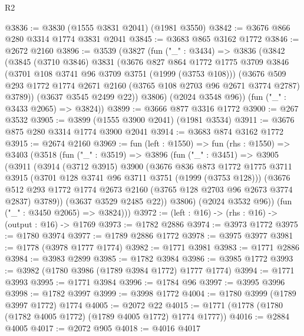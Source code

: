 \begin{lexlean}{R2}
\begin{coremodule}
@3836 := @3830 (@1555 @3831 @2041) (@1981 @3550)
@3842 := @3676 @866 @280 @3314 @1774 @3831 @2041
@3845 := @3683 @865 @3162 @1772
@3846 := @2672 @2160
@3896 := @3539
    (@3827
      (fun ("_" : @3434) =>
      @3836
        (@3842
          (@3845
            (@3710 @3846)
            @3831
            (@3676
              @827
              @864
              @1772
              @1775
              @3709
              @3846
              (@3701 @108 @3741 @96 @3709 @3751 (@1999 (@3753 @108)))
              (@3676
                @509
                @293
                @1772
                @1774
                @2671
                @2160
                (@3765 @108 @2703 @96 @2671 @3774 @2787)
                @3789))
            (@3637 @3545 @2499 @22))
          @3806)
        (@2024 @3548 @96))
      (fun ("_" : @3433 @2065) => @3824))
@3899 := @3666 @877 @3316 @1772
@3900 := @267 @3532
@3905 := @3899 (@1555 @3900 @2041) (@1981 @3534)
@3911 := @3676 @875 @280 @3314 @1774 @3900 @2041
@3914 := @3683 @874 @3162 @1772
@3915 := @2674 @2160
@3969 := fun (left : @1550) =>
  fun (rhs : @1550) =>
  @3403
    (@3518
      (fun ("_" : @3519) =>
      @3896
        (fun ("_" : @3451) =>
        @3905
          (@3911
            (@3914
              (@3712 @3915)
              @3900
              (@3676
                @836
                @873
                @1772
                @1775
                @3711
                @3915
                (@3701 @128 @3741 @96 @3711 @3751 (@1999 (@3753 @128)))
                (@3676
                  @512
                  @293
                  @1772
                  @1774
                  @2673
                  @2160
                  (@3765 @128 @2703 @96 @2673 @3774 @2837)
                  @3789))
              (@3637 @3529 @2485 @22))
            @3806)
          (@2024 @3532 @96))
        (fun ("_" : @3450 @2065) => @3824)))
@3972 := (left : @16) -> (rhs : @16) -> (output : @16) -> @1769
@3973 := @1782 @2886
@3974 := @3973 @1772
@3975 := @1780 @3974
@3977 := @1789 @2886 @1772
@3978 := @3975 @3977
@3981 := @1778 (@3978 @1777 @1774)
@3982 := @1771 @3981
@3983 := @1771 @2886
@3984 := @3983 @2899
@3985 := @1782 @3984
@3986 := @3985 @1772
@3993 := @3982 (@1780 @3986 (@1789 @3984 @1772) @1777 @1774)
@3994 := @1771 @3993
@3995 := @1771 @3984
@3996 := @1784 @96
@3997 := @3995 @3996
@3998 := @1782 @3997
@3999 := @3998 @1772
@4004 := @1780 @3999 (@1789 @3997 @1772) @1774
@4005 := @2072 @22
@4015 := @1771 (@1778 (@1780 (@1782 @4005 @1772) (@1789 @4005 @1772) @1774 @1777))
@4016 := @2884 @4005
@4017 := @2072 @905
@4018 := @4016 @4017

\end{coremodule}
\end{lexlean}
